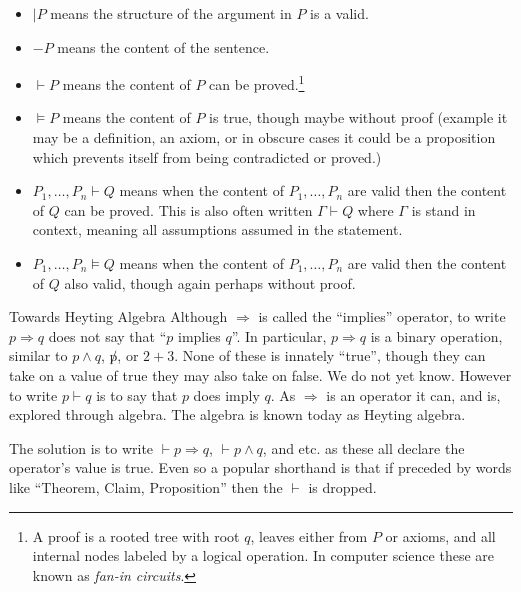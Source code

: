 \begin{itemize}
    \item $|P$ means the structure of the argument in $P$ is a valid.
    \item $-P$ means the content of the sentence.
    \item $\vdash P$ means the content of $P$ can be proved.\footnote{A proof is
    a rooted tree with root $q$, leaves either from $P$ or axioms, and all
    internal nodes labeled by a logical operation.  In computer science these
    are known as \emph{fan-in circuits}.} 
    \item $\vDash P$ means the content of $P$ is true, though maybe without proof
    (example it may be a definition, an axiom, or in obscure cases 
    it could be a proposition which prevents itself from being contradicted 
    or proved.)

    \item $P_1,\ldots,P_n \vdash Q$ means when the content of $P_1,\ldots,P_n$ are valid 
    then the content of $Q$ can be proved.  This is also often written 
    $\Gamma \vdash Q$ where $\Gamma$ is stand in context, meaning all 
    assumptions assumed in the statement.
    \item $P_1,\ldots,P_n \vDash Q$ means when the content of $P_1,\ldots,P_n$ are valid 
    then the content of $Q$ also valid, though again perhaps without proof.
\end{itemize}

\begin{remark}{Towards Heyting Algebra}
    Although $\Rightarrow$ is called the ``implies'' operator, to write $p\Rightarrow q$ 
    does not say that ``$p$ implies $q$''.  In particular, $p\Rightarrow q$ 
    is a binary operation, similar to $p\wedge q$, $\not p$, or $2+3$.  None 
    of these is innately ``true'', though they can take on a value of true 
    they may also take on false.  We do not yet know.  However to write 
    $p\vdash q$ is to say that $p$ does imply $q$.  As $\Rightarrow$ is an 
    operator it can, and is, explored through algebra.  The algebra is 
    known today as Heyting algebra.

    The solution is to write $\vdash p\Rightarrow q$, $\vdash p\wedge q$, 
    and etc. as these all declare the operator's value is true.  Even so 
    a popular shorthand is that if preceded by words like ``Theorem, Claim,
    Proposition'' then the $\vdash$ is dropped.
\end{remark}


